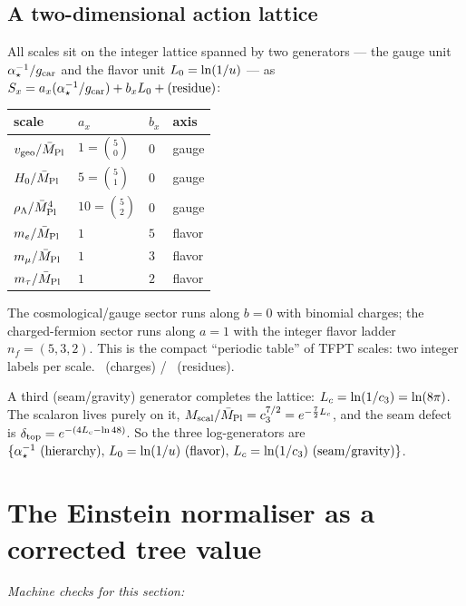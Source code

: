 \subsection{A two-dimensional action lattice}

All scales sit on the integer lattice spanned by two generators --- the gauge unit $\alpha^{-1}_\star/g_{\mathrm{car}}$ and
the flavor unit $L_0=\ln(1/u)$ --- as $S_x=a_x(\alpha^{-1}_\star/g_{\mathrm{car}})+b_x L_0+(\text{residue})$:
\begin{center}\small
\begin{tabular}{@{}llll@{}}
\toprule
scale & $a_x$ & $b_x$ & axis \\
\midrule
$v_{\mathrm{geo}}/\bar M_{\mathrm{Pl}}$ & $1=\binom50$ & $0$ & gauge \\
$H_0/\bar M_{\mathrm{Pl}}$ & $5=\binom51$ & $0$ & gauge \\
$\rho_\Lambda/\bar M_{\mathrm{Pl}}^4$ & $10=\binom52$ & $0$ & gauge \\
$m_e/\bar M_{\mathrm{Pl}}$ & $1$ & $5$ & flavor \\
$m_\mu/\bar M_{\mathrm{Pl}}$ & $1$ & $3$ & flavor \\
$m_\tau/\bar M_{\mathrm{Pl}}$ & $1$ & $2$ & flavor \\
\bottomrule
\end{tabular}
\end{center}
The cosmological/gauge sector runs along $b=0$ with binomial charges; the charged-fermion sector
runs along $a=1$ with the integer flavor ladder $n_f=(5,3,2)$. This is the compact ``periodic table''
of TFPT scales: two integer labels per scale. \mE\ (charges) / \mC\ (residues).

\noindent A third (seam/gravity) generator completes the lattice: $L_c=\ln(1/c_3)=\ln(8\pi)$.
The scalaron lives purely on it, $M_{\mathrm{scal}}/\bar M_{\mathrm{Pl}}=c_3^{7/2}=e^{-\frac72 L_c}$, and the seam
defect is $\delta_{\mathrm{top}}=e^{-(4L_c-\ln48)}$. So the three log-generators are $\{\ainv\ (\text{hierarchy}),\,
L_0=\ln(1/\useed)\ (\text{flavor}),\,L_c=\ln(1/\cthree)\ (\text{seam/gravity})\}$. \mE

\section{The Einstein normaliser as a corrected tree value}
\noindent\emph{Machine checks for this section:} 


